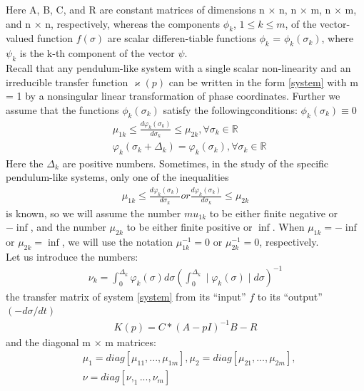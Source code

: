 \documentclass[a4paper]{article}
\begin{document}
Here A, B, C, and R are constant matrices of dimensions n × n, n × m, n × m, and n × n, respectively, whereas the components $\phi_k$, $1 \leq  k \leq m$, of the vector-valued function $f(\sigma)$ are scalar differen-tiable functions $\phi_k$ = $\phi_k(\sigma_k)$, where $\psi_k$ is the k-th component of the vector $\psi$.\\

Recall that any pendulum-like system with a single scalar non-linearity and an irreducible transfer function $\varkappa(p)$ can be written in the form \eqref{system} with m = 1 by a nonsingular linear transformation of phase coordinates. Further we assume that the functions $\phi_k(\sigma_k)$ satisfy the followingconditions: $\phi_k(\sigma_k) \equiv 0$\\
 \begin{equation}
 \begin{aligned}
&\mu_{1k} \leq \frac{d\varphi_k(\sigma_k)}{d\sigma_k} \leq \mu_{2k}, \forall \sigma_k \in \mathbb{R}\\
&\varphi_k(\sigma_k+\Delta_k) = \varphi_k(\sigma_k), \forall \sigma_k \in \mathbb{R}
 \end{aligned}
\end{equation}
Here the $\Delta_k$ are positive numbers. Sometimes, in the study of the specific pendulum-like systems, only one of the inequalities
 \begin{equation}
 \begin{aligned}
\mu_{1k} \leq \frac{d\varphi_k(\sigma_k)}{d\sigma_k}  or \frac{d\varphi_k(\sigma_k)}{d\sigma_k} \leq \mu_{2k}
 \end{aligned}
\end{equation}
is known, so we will assume the number $mu_{1k}$ to be either finite negative or $-\inf$, and the number $\mu_{2k}$ to be either finite positive or $\inf$.
When $\mu_{1k} = -\inf$ or $\mu_{2k} = \inf$, we will use the notation $\mu_{1k}^{-1} = 0$ or $\mu_{2k}^{-1} = 0$, respectively.\\

Let us introduce the numbers:
 \begin{equation}
 \begin{aligned}
\nu_k = \int_{0}^{\Delta_k} \varphi_k(\sigma) d\sigma (\int_{0}^{\Delta_k} \mid \varphi_k(\sigma) \mid d\sigma)^{-1}
 \end{aligned}
\end{equation}
the transfer matrix of system \eqref{system} from its “input” $f$ to its “output” $(-d\sigma/dt)$
 \begin{equation}
 \begin{aligned}
K(p) = C*(A - pI)^{-1}B - R
\end{aligned}
\end{equation}
and the diagonal m × m matrices:
 \begin{equation}
 \begin{aligned}
&\mu_1 = diag [\mu_{11}, . . . , \mu_{1m}],    \mu_2 = diag [\mu_{21}, . . . , \mu_{2m}],\\
&\nu = diag [\nu, _1. . . , \nu_m]
\end{aligned}
\end{equation}
\end{document}
